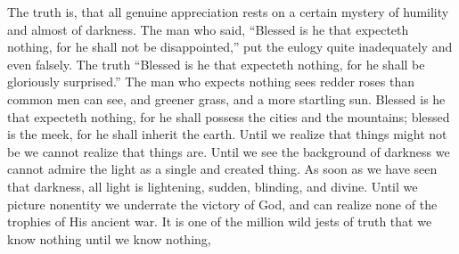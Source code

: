 The truth is, that all genuine appreciation rests on a certain mystery of humility and almost of darkness. The man who said, “Blessed is he that expecteth nothing, for he shall not be disappointed,” put the eulogy quite inadequately and even falsely. The truth “Blessed is he that expecteth nothing, for he shall be gloriously surprised.” The man who expects nothing sees redder roses than common men can see, and greener grass, and a more startling sun. Blessed is he that expecteth nothing, for he shall possess the cities and the mountains; blessed is the meek, for he shall inherit the earth. Until we realize that things might not be we cannot realize that things are. Until we see the background of darkness we cannot admire the light as a single and created thing. As soon as we have seen that darkness, all light is lightening, sudden, blinding, and divine. Until we picture nonentity we underrate the victory of God, and can realize none of the trophies of His ancient war. It is one of the million wild jests of truth that we know nothing until we know nothing,

